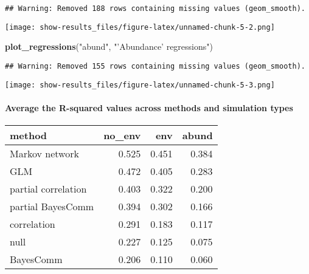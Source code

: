 \documentclass[11pt,]{article}
\newenvironment{Shaded}{\begin{snugshade}}{\end{snugshade}}
\newcommand{\KeywordTok}[1]{\textcolor[rgb]{0.13,0.29,0.53}{\textbf{{#1}}}}
\newcommand{\DataTypeTok}[1]{\textcolor[rgb]{0.13,0.29,0.53}{{#1}}}
\newcommand{\DecValTok}[1]{\textcolor[rgb]{0.00,0.00,0.81}{{#1}}}
\newcommand{\StringTok}[1]{\textcolor[rgb]{0.31,0.60,0.02}{{#1}}}
\newcommand{\NormalTok}[1]{{#1}}
\let\oldparagraph\paragraph
\renewcommand{\paragraph}[1]{\oldparagraph{#1}\mbox{}}
\begin{document}
\begin{verbatim}
## Warning: Removed 188 rows containing missing values (geom_smooth).
\end{verbatim}

\texttt{[image: show-results\_files/figure-latex/unnamed-chunk-5-2.png]}

\begin{Shaded}
\begin{Highlighting}[]
\KeywordTok{plot_regressions}\NormalTok{(}\StringTok{"abund"}\NormalTok{, }\StringTok{"'Abundance' regressions"}\NormalTok{)}
\end{Highlighting}
\end{Shaded}

\begin{verbatim}
## Warning: Removed 155 rows containing missing values (geom_smooth).
\end{verbatim}

\texttt{[image: show-results\_files/figure-latex/unnamed-chunk-5-3.png]}

\paragraph{Average the R-squared values across methods and simulation
types}\label{average-the-r-squared-values-across-methods-and-simulation-types}

\begin{Shaded}
\end{Shaded}

\begin{longtable}[c]{@{}lrrr@{}}
\toprule
method & no\_env & env & abund\tabularnewline
\midrule
\endhead
Markov network & 0.525 & 0.451 & 0.384\tabularnewline
GLM & 0.472 & 0.405 & 0.283\tabularnewline
partial correlation & 0.403 & 0.322 & 0.200\tabularnewline
partial BayesComm & 0.394 & 0.302 & 0.166\tabularnewline
correlation & 0.291 & 0.183 & 0.117\tabularnewline
null & 0.227 & 0.125 & 0.075\tabularnewline
BayesComm & 0.206 & 0.110 & 0.060\tabularnewline
\bottomrule
\end{longtable}
\end{document}

